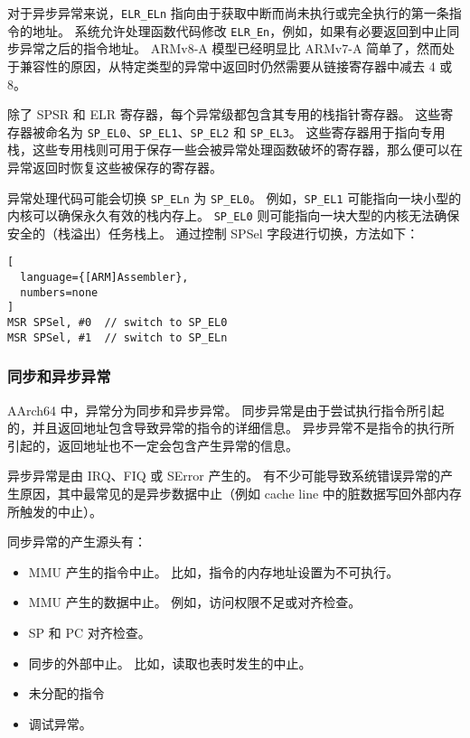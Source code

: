 对于异步异常来说，\lstinline!ELR_ELn! 指向由于获取中断而尚未执行或完全执行的第一条指令的地址。
系统允许处理函数代码修改 \lstinline!ELR_En!，例如，如果有必要返回到中止同步异常之后的指令地址。
ARMv8-A 模型已经明显比 ARMv7-A 简单了，然而处于兼容性的原因，从特定类型的异常中返回时仍然需要从链接寄存器中减去 4 或 8。

除了 SPSR 和 ELR 寄存器，每个异常级都包含其专用的栈指针寄存器。
这些寄存器被命名为 \lstinline!SP_EL0!、\lstinline!SP_EL1!、\lstinline!SP_EL2! 和 \lstinline!SP_EL3!。
这些寄存器用于指向专用栈，这些专用栈则可用于保存一些会被异常处理函数破坏的寄存器，那么便可以在异常返回时恢复这些被保存的寄存器。

异常处理代码可能会切换 \lstinline!SP_ELn! 为 \lstinline!SP_EL0!。
例如，\lstinline!SP_EL1! 可能指向一块小型的内核可以确保永久有效的栈内存上。
\lstinline!SP_EL0! 则可能指向一块大型的内核无法确保安全的（栈溢出）任务栈上。
通过控制 SPSel 字段进行切换，方法如下：

\begin{lstlisting}[
  language={[ARM]Assembler},
  numbers=none
]
MSR SPSel, #0  // switch to SP_EL0
MSR SPSel, #1  // switch to SP_ELn
\end{lstlisting}

\subsubsection{同步和异步异常}

AArch64 中，异常分为同步和异步异常。
同步异常是由于尝试执行指令所引起的，并且返回地址包含导致异常的指令的详细信息。
异步异常不是指令的执行所引起的，返回地址也不一定会包含产生异常的信息。

异步异常是由 IRQ、FIQ 或 SError 产生的。
有不少可能导致系统错误异常的产生原因，其中最常见的是异步数据中止（例如 cache line 中的脏数据写回外部内存所触发的中止）。

同步异常的产生源头有：

\begin{itemize}
  \item MMU 产生的指令中止。
    比如，指令的内存地址设置为不可执行。
  \item MMU 产生的数据中止。
    例如，访问权限不足或对齐检查。
  \item SP 和 PC 对齐检查。
  \item 同步的外部中止。
    比如，读取也表时发生的中止。
  \item 未分配的指令
  \item 调试异常。
\end{itemize}


